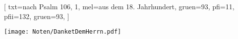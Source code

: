 [
    txt={nach Psalm 106, 1},
    mel={aus dem 18. Jahrhundert},
    gruen={93}, 
    pfi={11}, 
    pfii={132},
    gruen={93}, 
]

\texttt{[image: Noten/DanketDemHerrn.pdf]}

\endsong
